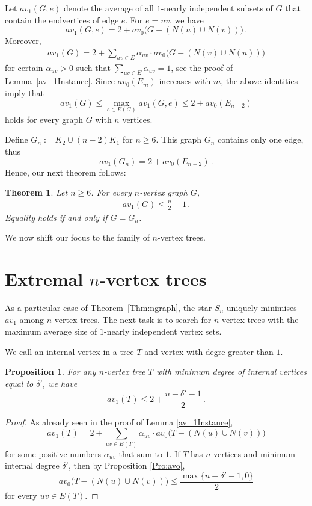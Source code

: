 \documentclass[a4paper,12pt]{amsart}
\newtheorem{proposition}[lemma]{Proposition}
\newtheorem{theorem}[lemma]{Theorem}
\theoremstyle{remark}
\begin{document}
\medskip
Let $av_1(G,e)$ denote the average of all $1$-nearly independent subsets of $G$ that contain the endvertices of edge $e$. For $e=uv$, we have
$$
av_1(G,e)=2+ av_0\big(G-(N(u) \cup N(v)) \big)\,.
$$ %
Moreover, 
\begin{align*}
av_1(G)=2+ \sum_{uv \in E} \alpha_{uv} \cdot av_0 \big( G-(N(v) \cup N(u)) \big)
\end{align*}
for certain $\alpha_{uv}>0$ such that $\sum_{uv \in E} \alpha_{uv}= 1$, see the proof of Lemma~\ref{av_1Instance}. Since $av_0(E_m)$ increases with $m$, the above identities imply that
$$
av_1(G)\leq \max_{e\in E(G)} av_1(G,e) \leq 2+ av_0(E_{n-2})
$$ holds for every graph $G$ with $n$ vertices.

\medskip
Define $G_n:=K_2\cup (n-2)K_1$ for $n\geq 6$. This graph $G_n$ contains only one edge, thus
$$
av_1(G_n)=2+ av_0(E_{n-2})\,.
$$
Hence, our next theorem follows:

\begin{theorem}
\label{Th:GenMax}
Let $n\geq 6$. For every $n$-vertex graph $G$, 
\begin{align*}
av_1(G)\leq \frac{n}{2}+1\,.
\end{align*}
Equality holds if and only if $G=G_n$.
\end{theorem}

\medskip
We now shift our focus to the family of $n$-vertex trees.

\section{Extremal $n$-vertex trees}\label{sect:tree}

As a particular case of Theorem~\ref{Thm:ngraph}, the star $S_n$ uniquely minimises $av_1$ among $n$-vertex trees. The next task is to search for $n$-vertex trees with the maximum average size of $1$-nearly independent vertex sets. 

We call an internal vertex in a tree $T$ and vertex with degre greater than $1$.

\begin{proposition}
For any $n$-vertex tree $T$ with minimum degree  of internal vertices equal to $\delta'$, we have
$$
av_1(T)\leq 2+\frac{n-\delta'-1}{2}\,.
$$
\end{proposition}
\begin{proof}
As already seen in the proof of Lemma \ref{av_1Instance},
$$
av_1(T)=2+ \sum_{uv \in E(T)} \alpha_{uv} \cdot av_0\big( T-(N(u) \cup N(v)) \big)
$$
for some positive numbers $\alpha_{uv}$ that sum to $1$. If $T$ has $n$ vertices and minimum internal degree $\delta'$, then by Proposition \ref{Pro:avo},
$$av_0\big( T-(N(u) \cup N(v)) \big) \leq \frac{\max\{n-\delta'-1,0\}}{2}$$ for every $uv \in E(T)$. 
\end{proof}
\end{document}
